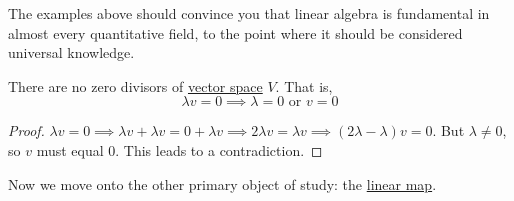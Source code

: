   The examples above should convince you that linear algebra is fundamental in almost every quantitative field, to the point where it should be considered universal knowledge.  

  \begin{theorem}
    \label{thm:no-zero-divisors}
    There are no zero divisors of \hyperref[def:vector-space]{vector space} $V$. That is, 
    \begin{equation}
      \lambda v = 0 \implies \lambda = 0 \text{ or } v = 0
    \end{equation}
  \end{theorem}
  \begin{proof}
    $\lambda v = 0 \implies \lambda v + \lambda v = 0 + \lambda v \implies 2\lambda v = \lambda v \implies (2\lambda - \lambda ) v = 0$. But $\lambda \neq 0$, so $v$ must equal $0$. This leads to a contradiction. 
  \end{proof} 

  Now we move onto the other primary object of study: the \hyperref[alg-thm:linear-map]{linear map}. 

